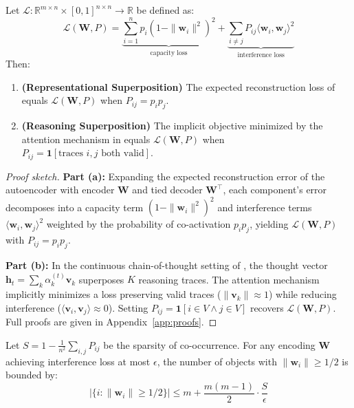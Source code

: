 \begin{theorem}
\label{thm:equivalence}
Let $\mathcal{L}: \mathbb{R}^{m \times n} \times [0,1]^{n \times n} \to \mathbb{R}$ be defined as:
\begin{equation}
\mathcal{L}(\mathbf{W}, P) = \underbrace{\sum_{i=1}^{n} p_i \left(1 - \|\mathbf{w}_i\|^2\right)^2}_{\text{capacity loss}} + \underbrace{\sum_{i \neq j} P_{ij} \langle \mathbf{w}_i, \mathbf{w}_j \rangle^2}_{\text{interference loss}}
\label{eq:master_loss}
\end{equation}
Then:
\begin{enumerate}
    \item[(a)] \textbf{(Representational Superposition)} The expected reconstruction loss of \citet{elhage2022toy} equals $\mathcal{L}(\mathbf{W}, P)$ when $P_{ij} = p_i p_j$.
    \item[(b)] \textbf{(Reasoning Superposition)} The implicit objective minimized by the attention mechanism in \citet{zhu2025reasoning} equals $\mathcal{L}(\mathbf{W}, P)$ when $P_{ij} = \mathbf{1}[\text{traces } i,j \text{ both valid}]$.
\end{enumerate}
\end{theorem}

\begin{proof}[Proof sketch]
\textbf{Part (a):} Expanding the expected reconstruction error of the autoencoder with encoder $\mathbf{W}$ and tied decoder $\mathbf{W}^\top$, each component's error decomposes into a capacity term $(1 - \|\mathbf{w}_i\|^2)^2$ and interference terms $\langle \mathbf{w}_i, \mathbf{w}_j \rangle^2$ weighted by the probability of co-activation $p_i p_j$, yielding $\mathcal{L}(\mathbf{W}, P)$ with $P_{ij} = p_i p_j$.

\textbf{Part (b):} In the continuous chain-of-thought setting of \citet{zhu2025reasoning}, the thought vector $\mathbf{h}_t = \sum_k \alpha_k^{(t)} \mathbf{v}_k$ superposes $K$ reasoning traces. The attention mechanism implicitly minimizes a loss preserving valid traces ($\|\mathbf{v}_k\| \approx 1$) while reducing interference ($\langle \mathbf{v}_i, \mathbf{v}_j \rangle \approx 0$). Setting $P_{ij} = \mathbf{1}[i \in V \land j \in V]$ recovers $\mathcal{L}(\mathbf{W}, P)$. Full proofs are given in Appendix~\ref{app:proofs}.
\end{proof}

\begin{corollary}
\label{cor:capacity}
Let $S = 1 - \frac{1}{n^2}\sum_{i,j} P_{ij}$ be the sparsity of co-occurrence. For any encoding $\mathbf{W}$ achieving interference loss at most $\epsilon$, the number of objects with $\|\mathbf{w}_i\| \geq 1/2$ is bounded by:
\begin{equation}
|\{i : \|\mathbf{w}_i\| \geq 1/2\}| \leq m + \frac{m(m-1)}{2} \cdot \frac{S}{\epsilon}
\end{equation}
\end{corollary}

